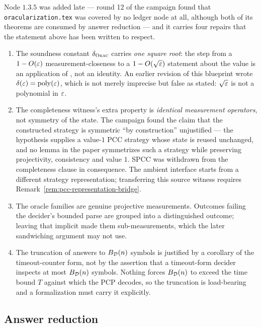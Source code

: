 \begin{remark}
\label{rem:oracularization-repairs}
Node $1.3.5$ was added late --- round 12 of the campaign found that
\texttt{oracularization.tex} was covered by no ledger node at all, although both of its
theorems are consumed by answer reduction --- and it carries four repairs that the
statement above has been written to respect.
\begin{enumerate}
\item The soundness constant $\delta_{\textsc{Orac}}$ carries \emph{one square root}: the step from a
  $1 - O(\varepsilon)$ measurement-closeness to a $1 - O(\sqrt{\varepsilon})$ statement about the value
  is an application of \cite[Fact 4.31]{NW19}, not an identity. An earlier revision of this
  blueprint wrote $\delta(\varepsilon) = \mathrm{poly}(\varepsilon)$, which is not merely imprecise but false as
  stated: $\sqrt{\varepsilon}$ is not a polynomial in $\varepsilon$.
\item The completeness witness's extra property is \emph{identical measurement operators},
  not symmetry of the state. The campaign found the claim that the constructed strategy is
  symmetric ``by construction'' unjustified --- the hypothesis supplies a value-$1$ PCC
  strategy whose state is reused unchanged, and no lemma in the paper symmetrizes such a
  strategy while preserving projectivity, consistency and value $1$. SPCC was withdrawn
  from the completeness clause in consequence. The ambient interface starts from a
  different strategy representation; transferring this source witness requires
  Remark~\ref{rem:pcc-representation-bridge}.
\item The oracle families are genuine projective measurements. Outcomes failing the
  decider's bounded parse are grouped into a distinguished outcome; leaving that implicit
  made them sub-measurements, which the later sandwiching argument may not use.
\item The truncation of answers to $B_{\mathcal{D}}(n)$ symbols is justified by a corollary of
  the timeout-counter form, not by the assertion that a timeout-form decider inspects at
  most $B_{\mathcal{D}}(n)$ symbols. Nothing forces $B_{\mathcal{D}}(n)$ to exceed the time bound
  $T$ against which the PCP decodes, so the truncation is load-bearing and a formalization
  must carry it explicitly.
\end{enumerate}
\end{remark}

\subsection{Answer reduction}
\label{sec:ps-answer-reduction}


